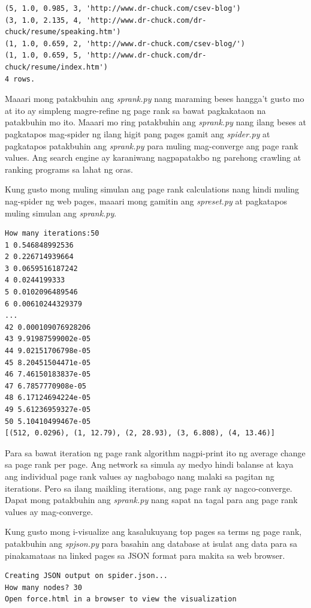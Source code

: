 \documentclass[10pt,]{book}
\begin{document}
{\small
\begin{verbatim}
(5, 1.0, 0.985, 3, 'http://www.dr-chuck.com/csev-blog')
(3, 1.0, 2.135, 4, 'http://www.dr-chuck.com/dr-chuck/resume/speaking.htm')
(1, 1.0, 0.659, 2, 'http://www.dr-chuck.com/csev-blog/')
(1, 1.0, 0.659, 5, 'http://www.dr-chuck.com/dr-chuck/resume/index.htm')
4 rows.
\end{verbatim}
}

Maaari mong patakbuhin ang \emph{sprank.py} nang maraming beses hangga't
gusto mo at ito ay simpleng magre-refine ng page rank sa bawat
pagkakataon na patakbuhin mo ito. Maaari mo ring patakbuhin ang
\emph{sprank.py} nang ilang beses at pagkatapos mag-spider ng ilang
higit pang pages gamit ang \emph{spider.py} at pagkatapos patakbuhin ang
\emph{sprank.py} para muling mag-converge ang page rank values. Ang
search engine ay karaniwang nagpapatakbo ng parehong crawling at ranking
programs sa lahat ng oras.

Kung gusto mong muling simulan ang page rank calculations nang hindi
muling nag-spider ng web pages, maaari mong gamitin ang
\emph{spreset.py} at pagkatapos muling simulan ang \emph{sprank.py}.

{\small
\begin{verbatim}
How many iterations:50
1 0.546848992536
2 0.226714939664
3 0.0659516187242
4 0.0244199333
5 0.0102096489546
6 0.00610244329379
...
42 0.000109076928206
43 9.91987599002e-05
44 9.02151706798e-05
45 8.20451504471e-05
46 7.46150183837e-05
47 6.7857770908e-05
48 6.17124694224e-05
49 5.61236959327e-05
50 5.10410499467e-05
[(512, 0.0296), (1, 12.79), (2, 28.93), (3, 6.808), (4, 13.46)]
\end{verbatim}
}

Para sa bawat iteration ng page rank algorithm nagpi-print ito ng
average change sa page rank per page. Ang network sa simula ay medyo
hindi balanse at kaya ang individual page rank values ay nagbabago nang
malaki sa pagitan ng iterations. Pero sa ilang maikling iterations, ang
page rank ay nagco-converge. Dapat mong patakbuhin ang \emph{sprank.py}
nang sapat na tagal para ang page rank values ay mag-converge.

Kung gusto mong i-visualize ang kasalukuyang top pages sa terms ng page
rank, patakbuhin ang \emph{spjson.py} para basahin ang database at
isulat ang data para sa pinakamataas na linked pages sa JSON format para
makita sa web browser.

{\small
\begin{verbatim}
Creating JSON output on spider.json...
How many nodes? 30
Open force.html in a browser to view the visualization
\end{verbatim}
}
\end{document}
